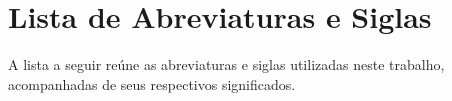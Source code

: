 \documentclass[
    12pt,                %
    openright,           %
    oneside,             %
    a4paper,             %
    english,             %
    brazil               %
]{abntex2}
\begin{document}
\listoffigures*
\cleardoublepage

\listoftables*
\cleardoublepage

 


\chapter*{Lista de Abreviaturas e Siglas}

\noindent
A lista a seguir reúne as abreviaturas e siglas utilizadas neste trabalho, acompanhadas de seus respectivos significados.

\vspace{\onelineskip}
\end{document}
